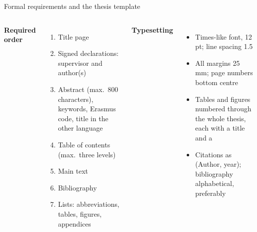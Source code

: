 \documentclass[aspectratio=169,11pt,t]{beamer}
\begin{document}
\begin{frame}{Formal requirements and the thesis template}
  \begin{columns}[T,onlytextwidth]
    \textbf{Required order}
    \begin{enumerate}\small
      \item Title page
      \item Signed declarations: supervisor and author(s)
      \item Abstract (max.\ 800 characters), keywords, Erasmus code, title in the other language
      \item Table of contents (max.\ three levels)
      \item Main text
      \item Bibliography
      \item Lists: abbreviations, tables, figures, appendices
    \end{enumerate}
    \textbf{Typesetting}
    \begin{itemize}\small
      \item Times-like font, 12 pt; line spacing 1.5
      \item All margins 25 mm; page numbers bottom centre
      \item Tables and figures numbered through the whole thesis, each with a title and a 
      \item Citations as (Author, year); bibliography alphabetical, preferably 
    \end{itemize}
  \end{columns}
\end{frame}
\end{document}
